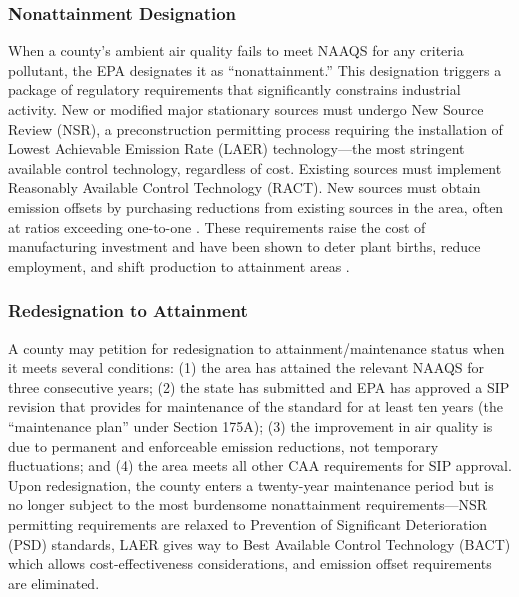 \documentclass[12pt]{article}
\begin{document}
\subsubsection*{Nonattainment Designation} When a county's ambient air quality fails to meet NAAQS for any criteria pollutant, the EPA designates it as ``nonattainment.'' This designation triggers a package of regulatory requirements that significantly constrains industrial activity. New or modified major stationary sources must undergo New Source Review (NSR), a preconstruction permitting process requiring the installation of Lowest Achievable Emission Rate (LAER) technology---the most stringent available control technology, regardless of cost. Existing sources must implement Reasonably Available Control Technology (RACT). New sources must obtain emission offsets by purchasing reductions from existing sources in the area, often at ratios exceeding one-to-one \citep{Grainger2012}. These requirements raise the cost of manufacturing investment and have been shown to deter plant births, reduce employment, and shift production to attainment areas \citep{Henderson1996, Greenstone2002, List2003}.

\subsubsection*{Redesignation to Attainment} A county may petition for redesignation to attainment/maintenance status when it meets several conditions: (1) the area has attained the relevant NAAQS for three consecutive years; (2) the state has submitted and EPA has approved a SIP revision that provides for maintenance of the standard for at least ten years (the ``maintenance plan'' under Section 175A); (3) the improvement in air quality is due to permanent and enforceable emission reductions, not temporary fluctuations; and (4) the area meets all other CAA requirements for SIP approval. Upon redesignation, the county enters a twenty-year maintenance period but is no longer subject to the most burdensome nonattainment requirements---NSR permitting requirements are relaxed to Prevention of Significant Deterioration (PSD) standards, LAER gives way to Best Available Control Technology (BACT) which allows cost-effectiveness considerations, and emission offset requirements are eliminated.
\end{document}
